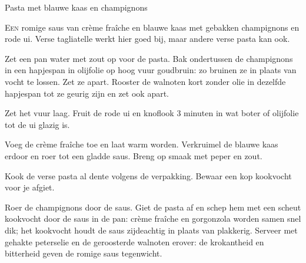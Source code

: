 \begin{recipe}{Pasta met blauwe kaas en champignons}


\lettrine{E}{en} romige saus van crème fraîche en blauwe kaas met gebakken champignons
en rode ui. Verse tagliatelle werkt hier goed bij, maar andere verse pasta kan ook.

\begin{ingredients}
\end{ingredients}

\begin{steps}
  \item Zet een pan water met zout op voor de pasta. Bak ondertussen de
        champignons in een hapjespan in olijfolie op hoog vuur goudbruin: zo
        bruinen ze in plaats van vocht te lossen. Zet ze apart. Rooster de
        walnoten kort zonder olie in dezelfde hapjespan tot ze geurig zijn en
        zet ook apart.
  \item Zet het vuur laag. Fruit de rode ui en knoflook 3 minuten in wat boter of
        olijfolie tot de ui glazig is.
  \item Voeg de crème fraîche toe en laat warm worden. Verkruimel de blauwe kaas erdoor
        en roer tot een gladde saus. Breng op smaak met peper en zout.
  \item Kook de verse pasta al dente volgens de verpakking. Bewaar een kop
        kookvocht voor je afgiet.
  \item Roer de champignons door de saus. Giet de pasta af en schep hem met een
        scheut kookvocht door de saus in de pan: crème fraîche en gorgonzola
        worden samen snel dik; het kookvocht houdt de saus zijdeachtig in plaats
        van plakkerig. Serveer met gehakte peterselie en de geroosterde walnoten
        erover: de krokantheid en bitterheid geven de romige saus tegenwicht.
\end{steps}

\end{recipe}
